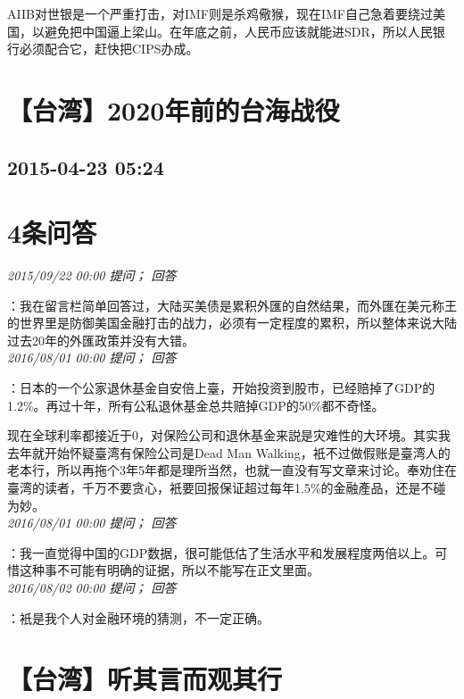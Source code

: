 \documentclass[twocolumn]{ctexart}
\begin{document}
AIIB对世银是一个严重打击，对IMF则是杀鸡儆猴，现在IMF自己急着要绕过美国，以避免把中国逼上梁山。在年底之前，人民币应该就能进SDR，所以人民银行必须配合它，赶快把CIPS办成。\\


\section{【台湾】2020年前的台海战役}
\subsection{2015-04-23 05:24}


\section{4条问答}

\textit{\hfill\noindent\small 2015/09/22 00:00 提问； 回答}

：我在留言栏简单回答过，大陆买美债是累积外匯的自然结果，而外匯在美元称王的世界里是防御美国金融打击的战力，必须有一定程度的累积，所以整体来说大陆过去20年的外匯政策并没有大错。\\

\textit{\hfill\noindent\small 2016/08/01 00:00 提问； 回答}

：日本的一个公家退休基金自安倍上臺，开始投资到股市，已经赔掉了GDP的1.2\%。再过十年，所有公私退休基金总共赔掉GDP的50\%都不奇怪。

现在全球利率都接近于0，对保险公司和退休基金来説是灾难性的大环境。其实我去年就开始怀疑臺湾有保险公司是Dead Man Walking，衹不过做假账是臺湾人的老本行，所以再拖个3年5年都是理所当然，也就一直没有写文章来讨论。奉劝住在臺湾的读者，千万不要贪心，衹要回报保证超过每年1.5\%的金融產品，还是不碰为妙。\\

\textit{\hfill\noindent\small 2016/08/01 00:00 提问； 回答}

：我一直觉得中国的GDP数据，很可能低估了生活水平和发展程度两倍以上。可惜这种事不可能有明确的证据，所以不能写在正文里面。\\

\textit{\hfill\noindent\small 2016/08/02 00:00 提问； 回答}

：衹是我个人对金融环境的猜测，不一定正确。\\


\section{【台湾】听其言而观其行 }
\end{document}
